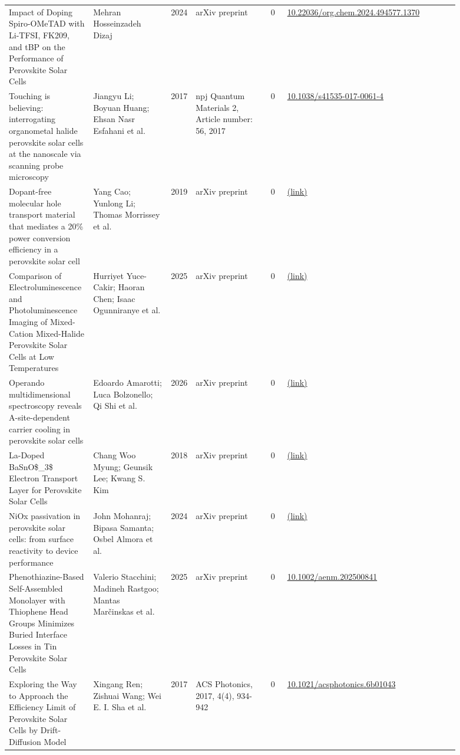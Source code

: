 \documentclass[10pt,a4paper]{article}
\begin{document}
{\begin{longtable}{p{0.197\linewidth}p{0.197\linewidth}p{0.043\linewidth}p{0.197\linewidth}p{0.043\linewidth}p{0.117\linewidth}p{0.098\linewidth}}
Impact of Doping Spiro-OMeTAD with Li-TFSI, FK209, and tBP on the Performance of Perovskite Solar Cells & Mehran Hosseinzadeh Dizaj & 2024 & arXiv preprint & 0 & \href{https://doi.org/10.22036/org.chem.2024.494577.1370}{10.22036/org.chem.2024.494577.1370} &  \\
Touching is believing: interrogating organometal halide perovskite solar cells at the nanoscale via scanning probe microscopy & Jiangyu Li; Boyuan Huang; Ehsan Nasr Esfahani et al. & 2017 & npj Quantum Materials 2, Article number: 56, 2017 & 0 & \href{https://doi.org/10.1038/s41535-017-0061-4}{10.1038/s41535-017-0061-4} &  \\
Dopant-free molecular hole transport material that mediates a 20\% power conversion efficiency in a perovskite solar cell & Yang Cao; Yunlong Li; Thomas Morrissey et al. & 2019 & arXiv preprint & 0 & \href{http://arxiv.org/abs/1908.04439v1}{(link)} &  \\
Comparison of Electroluminescence and Photoluminescence Imaging of Mixed-Cation Mixed-Halide Perovskite Solar Cells at Low Temperatures & Hurriyet Yuce-Cakir; Haoran Chen; Isaac Ogunniranye et al. & 2025 & arXiv preprint & 0 & \href{http://arxiv.org/abs/2510.14213v1}{(link)} &  \\
Operando multidimensional spectroscopy reveals A-site-dependent carrier cooling in perovskite solar cells & Edoardo Amarotti; Luca Bolzonello; Qi Shi et al. & 2026 & arXiv preprint & 0 & \href{http://arxiv.org/abs/2608.17577v1}{(link)} &  \\
La-Doped BaSnO\$\_3\$ Electron Transport Layer for Perovskite Solar Cells & Chang Woo Myung; Geunsik Lee; Kwang S. Kim & 2018 & arXiv preprint & 0 & \href{http://arxiv.org/abs/1808.04979v2}{(link)} &  \\
NiOx passivation in perovskite solar cells: from surface reactivity to device performance & John Mohanraj; Bipasa Samanta; Osbel Almora et al. & 2024 & arXiv preprint & 0 & \href{http://arxiv.org/abs/2402.10286v1}{(link)} &  \\
Phenothiazine-Based Self-Assembled Monolayer with Thiophene Head Groups Minimizes Buried Interface Losses in Tin Perovskite Solar Cells & Valerio Stacchini; Madineh Rastgoo; Mantas Marčinskas et al. & 2025 & arXiv preprint & 0 & \href{https://doi.org/10.1002/aenm.202500841}{10.1002/aenm.202500841} &  \\
Exploring the Way to Approach the Efficiency Limit of Perovskite Solar Cells by Drift-Diffusion Model & Xingang Ren; Zishuai Wang; Wei E. I. Sha et al. & 2017 & ACS Photonics, 2017, 4(4), 934-942 & 0 & \href{https://doi.org/10.1021/acsphotonics.6b01043}{10.1021/acsphotonics.6b01043} &  \\

\end{longtable}}
\end{document}
